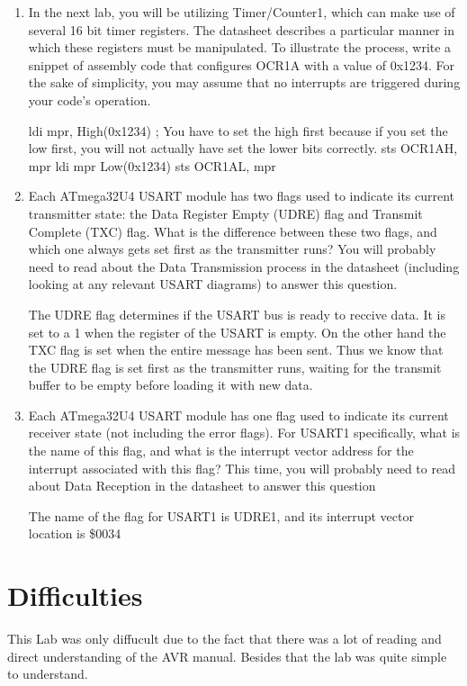 \documentclass[12pt,letterpaper]{article}
\begin{document}
\begin{enumerate}
   
    \item 
	In the next lab, you will be utilizing Timer/Counter1, which can make use of several 16 bit timer registers. The datasheet describes a particular manner in which these registers must be manipulated. To illustrate the process,
	write a snippet of assembly code that configures OCR1A with a value of 0x1234. For the sake of simplicity, you may assume that no interrupts are triggered during your code’s operation.
	
	ldi mpr, High(0x1234) ; You have to set the high first because if you set the low first, you will not actually have set the lower bits correctly.
	sts OCR1AH, mpr
	ldi mpr Low(0x1234)
	sts OCR1AL, mpr
	
    
    \item
    Each ATmega32U4 USART module has two flags used to indicate its current transmitter state: the Data Register Empty (UDRE) flag and Transmit Complete (TXC) flag. What is the difference between these two flags, and which one always gets set first as the transmitter runs? You will probably need to read about the Data Transmission process in the datasheet (including looking at any relevant USART diagrams) to answer this question.
    
    The UDRE flag determines if the USART bus is ready to reccive data. It is set to a 1 when the register of the USART is empty. On the other hand the TXC flag is set when the entire message has been sent. Thus we know that the UDRE flag is set first as the transmitter runs, waiting for the transmit buffer to be empty before loading it with new data.
    
    \item 
    Each ATmega32U4 USART module has one flag used to indicate its current receiver state (not including the error flags). For USART1 specifically, what is the name of this flag, and what is the interrupt vector address for the
    interrupt associated with this flag? This time, you will probably need to read about Data Reception in the datasheet to answer this question
    
    The name of the flag for USART1 is UDRE1, and its interrupt vector location is \$0034 
    
       
    
\end{enumerate}

\section{Difficulties}
This Lab was only diffucult due to the fact that there was a lot of reading and direct understanding of the AVR manual. Besides that the lab was quite simple to understand.
\end{document}
